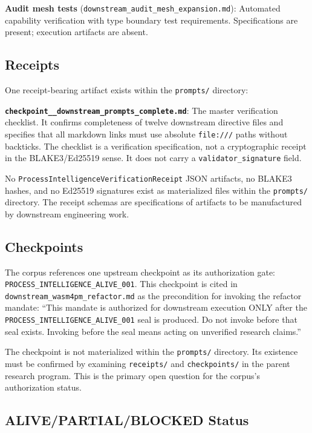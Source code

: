 \textbf{Audit mesh tests} (\texttt{downstream\_audit\_mesh\_expansion.md}):
Automated capability verification with type boundary test requirements. Specifications
are present; execution artifacts are absent.

\subsection{Receipts}
\label{sec:prompts-evidence-receipts}

One receipt-bearing artifact exists within the \texttt{prompts/} directory:

\textbf{\texttt{checkpoint\_\_downstream\_prompts\_complete.md}}: The master
verification checklist. It confirms completeness of twelve downstream directive files
and specifies that all markdown links must use absolute \texttt{file:///} paths
without backticks. The checklist is a verification specification, not a cryptographic
receipt in the BLAKE3/Ed25519 sense. It does not carry a \texttt{validator\_signature}
field.

No \texttt{ProcessIntelligenceVerificationReceipt} JSON artifacts, no BLAKE3 hashes,
and no Ed25519 signatures exist as materialized files within the \texttt{prompts/}
directory. The receipt schemas are specifications of artifacts to be manufactured by
downstream engineering work.

\subsection{Checkpoints}
\label{sec:prompts-evidence-checkpoints}

The corpus references one upstream checkpoint as its authorization gate:
\texttt{PROCESS\_INTELLIGENCE\_ALIVE\_001}. This checkpoint is cited in
\texttt{downstream\_wasm4pm\_refactor.md} as the precondition for invoking the
refactor mandate: ``This mandate is authorized for downstream execution ONLY after
the \texttt{PROCESS\_INTELLIGENCE\_ALIVE\_001} seal is produced. Do not invoke before
that seal exists. Invoking before the seal means acting on unverified research
claims.''

The checkpoint is not materialized within the \texttt{prompts/} directory. Its
existence must be confirmed by examining \texttt{receipts/} and
\texttt{checkpoints/} in the parent research program. This is the primary open
question for the corpus's authorization status.

\subsection{ALIVE/PARTIAL/BLOCKED Status}
\label{sec:prompts-evidence-status}


